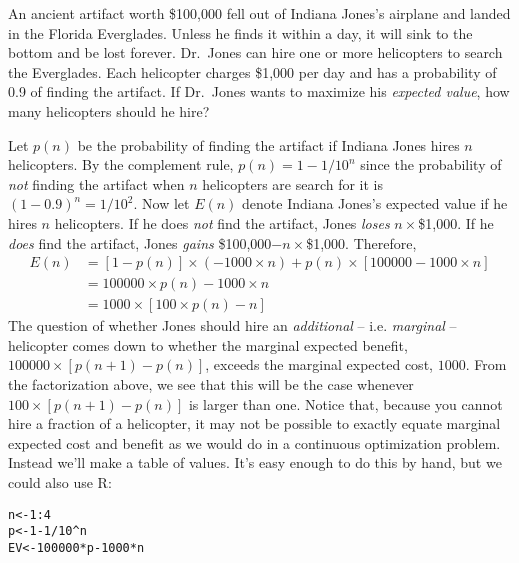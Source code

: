 \documentclass[addpoints,12pt]{exam}\usepackage[]{graphicx}\usepackage[]{color}
\makeatletter
\newcommand{\hlnum}[1]{\textcolor[rgb]{0.686,0.059,0.569}{#1}}%
\newcommand{\hlopt}[1]{\textcolor[rgb]{0,0,0}{#1}}%
\newcommand{\hlstd}[1]{\textcolor[rgb]{0.345,0.345,0.345}{#1}}%
\newcommand{\hlkwb}[1]{\textcolor[rgb]{0.69,0.353,0.396}{#1}}%
\newenvironment{kframe}{%
 \def\at@end@of@kframe{}%
 \ifinner\ifhmode%
  \def\at@end@of@kframe{\end{minipage}}%
  \begin{minipage}{\columnwidth}%
 \fi\fi%
 \def\FrameCommand##1{\hskip\@totalleftmargin \hskip-\fboxsep
 \colorbox{shadecolor}{##1}\hskip-\fboxsep
     \hskip-\linewidth \hskip-\@totalleftmargin \hskip\columnwidth}%
 \MakeFramed {\advance\hsize-\width
   \@totalleftmargin\z@ \linewidth\hsize
   \@setminipage}}%
 {\par\unskip\endMakeFramed%
 \at@end@of@kframe}
\newenvironment{knitrout}{}{} %
\makeatother
\begin{document}
\begin{questions}
  \question An ancient artifact worth \$100,000 fell out of Indiana Jones's airplane and landed in the Florida Everglades. Unless he finds it within a day, it will sink to the bottom and be lost forever. Dr.\ Jones can hire one or more helicopters to search the Everglades. Each helicopter charges \$1,000 per day and has a probability of 0.9 of finding the artifact. If Dr.\ Jones wants to maximize his \emph{expected value}, how many helicopters should he hire?
  \begin{solution}
    Let $p(n)$ be the probability of finding the artifact if Indiana Jones hires $n$ helicopters.
    By the complement rule, $p(n) = 1 - 1/10^n$ since the probability of \emph{not} finding the artifact when $n$ helicopters are search for it is $(1 - 0.9)^n = 1/10^2$.
    Now let $E(n)$ denote Indiana Jones's expected value if he hires $n$ helicopters.
    If he does \emph{not} find the artifact, Jones \emph{loses} $n \times $\$1,000.
    If he \emph{does} find the artifact, Jones \emph{gains} \$100,000$- n\times $\$1,000.
    Therefore,
    \begin{align*}
      E(n) &= \left[ 1 - p(n) \right] \times \left( -1000 \times n \right) + p(n) \times \left[ 100000 - 1000 \times n \right]\\
      &= 100000 \times p(n) - 1000 \times n\\
      &= 1000 \times \left[ 100 \times p(n) - n \right]
    \end{align*}
    The question of whether Jones should hire an \emph{additional} -- i.e. \emph{marginal} -- helicopter comes down to whether the marginal expected benefit, $100000 \times \left[p(n+1) - p(n)\right]$, exceeds the marginal expected cost, $1000$.
    From the factorization above, we see that this will be the case whenever $100 \times \left[p(n+1) - p(n)\right]$ is larger than one.
    Notice that, because you cannot hire a fraction of a helicopter, it may not be possible to exactly equate marginal expected cost and benefit as we would do in a continuous optimization problem.
    Instead we'll make a table of values. 
    It's easy enough to do this by hand, but we could also use R:
\begin{knitrout}
\color{fgcolor}\begin{kframe}
\begin{alltt}
\hlstd{n} \hlkwb{<-} \hlnum{1}\hlopt{:}\hlnum{4}
\hlstd{p} \hlkwb{<-} \hlnum{1} \hlopt{-} \hlnum{1}\hlopt{/}\hlnum{10}\hlopt{^}\hlstd{n}
\hlstd{EV} \hlkwb{<-} \hlnum{100000} \hlopt{*} \hlstd{p} \hlopt{-} \hlnum{1000} \hlopt{*} \hlstd{n}

\end{alltt}
\end{kframe}
\end{knitrout}
\end{solution}
\end{questions}
\end{document}
